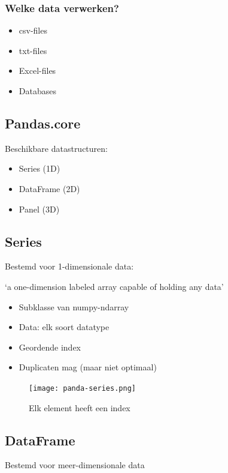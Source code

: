 \documentclass{article}
\begin{document}
\subsubsection{Welke data verwerken?}

\begin{itemize}
    \item csv-files
    \item txt-files
    \item Excel-files
    \item Databases
\end{itemize}

\subsection{Pandas.core}

Beschikbare datastructuren:

\begin{itemize}
    \item Series (1D)
    \item DataFrame (2D)
    \item Panel (3D)
\end{itemize}

\subsection{Series}

Bestemd voor 1-dimensionale data: 

`a one-dimension labeled array capable of holding any data'


\begin{itemize}
    \item Subklasse van numpy-ndarray
    \item Data: elk soort datatype
    \item Geordende index
    \item Duplicaten mag (maar niet optimaal)
\end{itemize}

\begin{figure}[H]
    \centering
    \texttt{[image: panda-series.png]}
    \caption{Elk element heeft een index}
\end{figure}

\subsection{DataFrame}

Bestemd voor meer-dimensionale data
\end{document}
